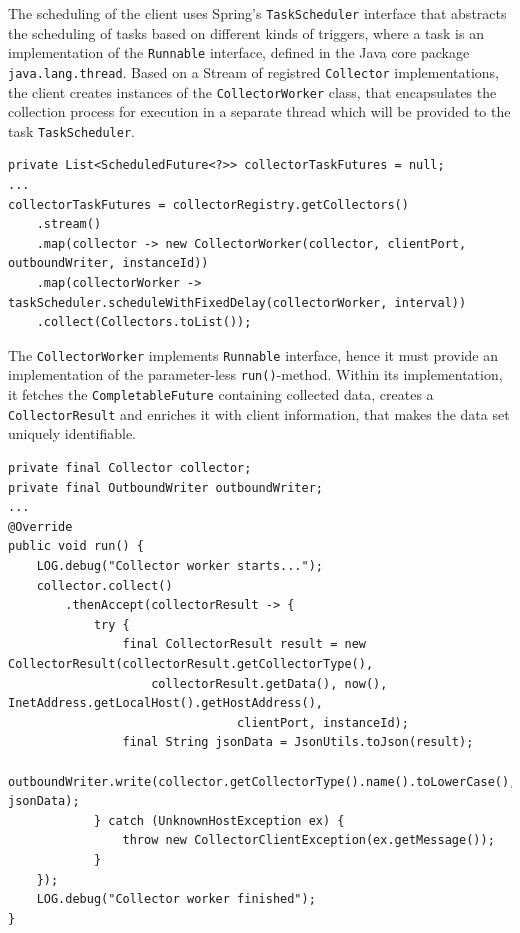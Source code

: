 The scheduling of the client uses Spring's \verb|TaskScheduler| interface that abstracts the scheduling of tasks based on different
kinds of triggers, where a task is an implementation of the \verb|Runnable| interface, defined in the Java core package \verb|java.lang.thread|.
Based on a Stream of registred \verb|Collector| implementations, the client creates instances of the \verb|CollectorWorker| class, that
encapsulates the collection process for execution in a separate thread which will be provided to the task \verb|TaskScheduler|.

\begin{lstlisting}[caption={"CollectorClient", collector registry}, captionpos=b, label={lst:collector-client-registry}]
private List<ScheduledFuture<?>> collectorTaskFutures = null;
...
collectorTaskFutures = collectorRegistry.getCollectors()
    .stream()
    .map(collector -> new CollectorWorker(collector, clientPort, outboundWriter, instanceId))
    .map(collectorWorker -> taskScheduler.scheduleWithFixedDelay(collectorWorker, interval))
    .collect(Collectors.toList());
\end{lstlisting}

The \verb|CollectorWorker| implements \verb|Runnable| interface, hence it must provide an implementation of the parameter-less
\verb|run()|-method. Within its implementation, it fetches the \verb|CompletableFuture| containing collected data, creates a \verb|CollectorResult|
and enriches it with client information, that makes the data set uniquely identifiable.

\begin{lstlisting}[caption={"CollectorWorker", collector registry}, captionpos=b, label={lst:collector-worker}]
private final Collector collector;
private final OutboundWriter outboundWriter;
...
@Override
public void run() {
    LOG.debug("Collector worker starts...");
    collector.collect()
        .thenAccept(collectorResult -> {
            try {
                final CollectorResult result = new CollectorResult(collectorResult.getCollectorType(),
                    collectorResult.getData(), now(), InetAddress.getLocalHost().getHostAddress(),
                                clientPort, instanceId);
                final String jsonData = JsonUtils.toJson(result);
                outboundWriter.write(collector.getCollectorType().name().toLowerCase(), jsonData);
            } catch (UnknownHostException ex) {
                throw new CollectorClientException(ex.getMessage());
            }
    });
    LOG.debug("Collector worker finished");
}
\end{lstlisting}

